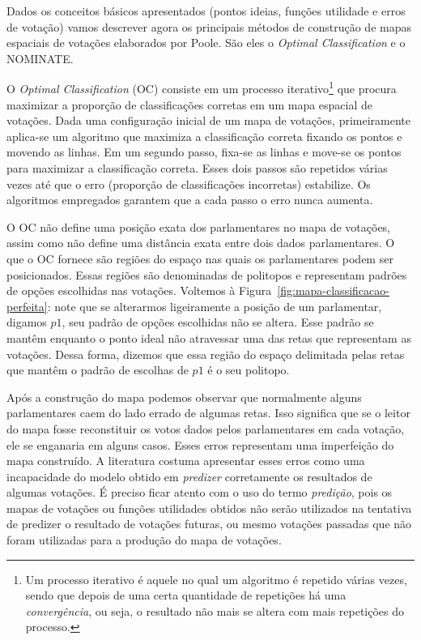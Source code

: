 \documentclass[a4paper, 12pt]{article}
\begin{document}
Dados os conceitos básicos apresentados (pontos ideias, funções utilidade e erros de votação) vamos descrever agora os principais métodos de construção de mapas espaciais de votações elaborados por Poole. São eles o \emph{Optimal Classification} e o NOMINATE.

O \emph{Optimal Classification} (OC) consiste em um processo iterativo\footnote{Um processo iterativo é aquele no qual um algoritmo é repetido várias vezes, sendo que depois de uma certa quantidade de repetições há uma \emph{convergência}, ou seja, o resultado não mais se altera com mais repetições do processo.} que procura maximizar a proporção de classificações corretas em um mapa espacial de votações. Dada uma configuração inicial de um mapa de votações, primeiramente aplica-se um algoritmo que maximiza a classificação correta fixando os pontos e movendo as linhas. Em um segundo passo, fixa-se as linhas e move-se os pontos para maximizar a classificação correta. Esses dois passos são repetidos várias vezes até que o erro (proporção de classificações incorretas) estabilize. Os algoritmos empregados garantem que a cada passo o erro nunca aumenta. 

O OC não define uma posição exata dos parlamentares no mapa de votações, assim como não define uma distância exata entre dois dados parlamentares. O que o OC fornece são regiões do espaço nas quais os parlamentares podem ser posicionados. Essas regiões são denominadas de politopos e representam padrões de opções escolhidas nas votações. Voltemos à Figura~\ref{fig:mapa-classificacao-perfeita}: note que se alterarmos ligeiramente a posição de um parlamentar, digamos $p1$, seu padrão de opções escolhidas não se altera. Esse padrão se mantêm enquanto o ponto ideal não atravessar uma das retas que representam as votações. Dessa forma, dizemos que essa região do espaço delimitada pelas retas que mantêm o padrão de escolhas de $p1$ é o seu politopo.

Após a construção do mapa podemos observar que normalmente alguns parlamentares caem do lado errado de algumas retas. Isso significa que se o leitor do mapa fosse reconstituir os votos dados pelos parlamentares em cada votação, ele se enganaria em alguns casos. Esses erros representam uma imperfeição do mapa construído. A literatura costuma apresentar esses erros como uma incapacidade do modelo obtido em \emph{predizer} corretamente os resultados de algumas votações. É preciso ficar atento com o uso do termo \emph{predição}, pois os mapas de votações ou funções utilidades obtidos não serão utilizados na tentativa de predizer o resultado de votações futuras, ou mesmo votações passadas que não foram utilizadas para a produção do mapa de votações. 
\end{document}
